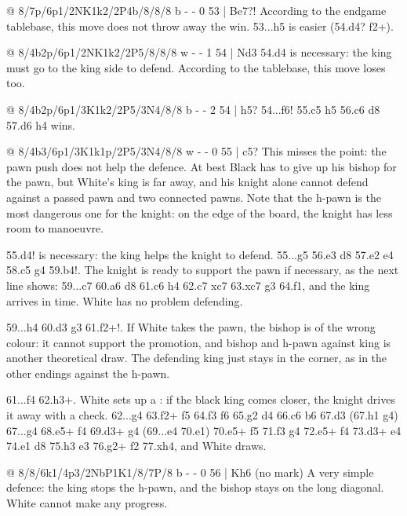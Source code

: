 @ 8/7p/6p1/2NK1k2/2P4b/8/8/8 b - - 0 53 | Be7?!
According to the endgame tablebase, this move does not throw away the win. 53...h5 is easier
(54.\K d4? \B f2+).

@ 8/4b2p/6p1/2NK1k2/2P5/8/8/8 w - - 1 54 | Nd3
54.\K d4 is necessary: the king must go to the king side to defend. According to the tablebase,
this move loses too.

@ 8/4b2p/6p1/3K1k2/2P5/3N4/8/8 b - - 2 54 | h5?
54...\B f6! 55.c5 h5 56.c6 \B d8 57.\K d6 h4 wins.

@ 8/4b3/6p1/3K1k1p/2P5/3N4/8/8 w - - 0 55 | c5?
This misses the point: the pawn push does not help the defence. At best Black has to give up his
bishop for the pawn, but White's king is far away, and his knight alone cannot defend against a
passed pawn and two connected pawns. Note that the h-pawn is the most dangerous one for the knight:
on the edge of the board, the knight has less room to manoeuvre.

55.\K d4! is necessary: the king helps the knight to defend. 55...g5 56.\K e3 \B d8 57.\K e2
\K e4 58.c5 g4 59.\N b4!. The knight is ready to support the pawn if necessary, as the next line
shows: 59...\B c7 60.\N a6 \B d8 61.c6 h4 62.c7 \B xc7 63.\N xc7 g3 64.\K f1, and the king arrives
in time. White has no problem defending.

59...h4 60.\N d3 g3 61.\N f2+!. If White takes the pawn, the bishop is of the wrong colour: it
cannot support the promotion, and bishop and h-pawn against king is another theoretical draw.
The defending king just stays in the corner, as in the other endings against the h-pawn.

61...\K f4 62.\N h3+. White sets up a : if the black king comes
closer, the knight drives it away with a check. 62...\K g4 63.\N f2+ \K f5 64.\K f3 \B f6 65.\K g2
\B d4 66.c6 \B b6 67.\N d3 (67.\N h1 \K g4) 67...\K g4 68.\N e5+ \K f4 69.\N d3+ \K g4 (69...\K e4
70.\N e1) 70.\N e5+ \K f5 71.\N f3 \K g4 72.\N e5+ \K f4 73.\N d3+ \K e4 74.\N e1 \B d8 75.\K h3
\K e3 76.\N g2+ \K f2 77.\N xh4, and White draws.

@ 8/8/6k1/4p3/2NbP1K1/8/7P/8 b - - 0 56 | Kh6 (no mark)
A very simple defence: the king stops the h-pawn, and the bishop stays on the long diagonal.
White cannot make any progress.

